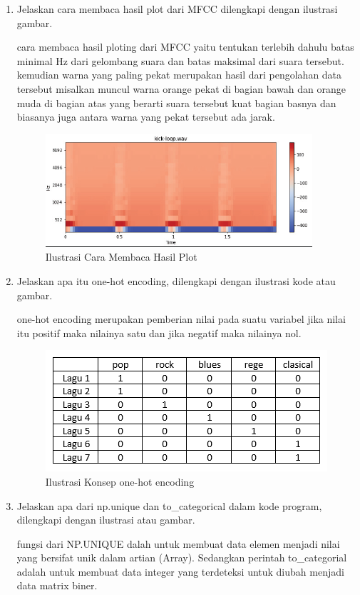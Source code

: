 \begin{enumerate}
\item Jelaskan cara membaca hasil plot dari MFCC dilengkapi dengan ilustrasi gambar. \par
cara membaca hasil ploting dari MFCC yaitu tentukan terlebih dahulu batas minimal Hz dari 
gelombang suara dan batas maksimal dari suara tersebut. kemudian warna yang paling pekat merupakan hasil 
dari pengolahan data tersebut misalkan muncul warna orange pekat di bagian bawah dan orange muda di bagian atas
yang berarti suara tersebut kuat bagian basnya dan biasanya juga antara warna yang pekat tersebut ada jarak.

\begin{figure}[ht]
\centering
\includegraphics[scale=0.5]{figures/1174003/chapter6/1,5.PNG}
\caption{Ilustrasi Cara Membaca Hasil Plot}
\label{contoh}
\end{figure}

\item Jelaskan apa itu one-hot encoding, dilengkapi dengan ilustrasi kode atau gambar.\par
one-hot encoding merupakan pemberian nilai pada suatu variabel jika nilai itu positif 
maka nilainya satu dan jika negatif maka nilainya nol.

\begin{figure}[ht]
\centering
\includegraphics[scale=0.5]{figures/1174003/chapter6/1,6.PNG}
\caption{Ilustrasi Konsep one-hot encoding}
\label{contoh}
\end{figure}

\item Jelaskan apa dari np.unique dan to\_categorical dalam kode program, dilengkapi dengan ilustrasi atau gambar.\par
fungsi dari NP.UNIQUE dalah untuk membuat data elemen menjadi nilai yang bersifat unik dalam artian (Array). 
Sedangkan perintah to\_categorial adalah untuk membuat data integer yang terdeteksi untuk diubah menjadi data matrix biner. 
    

\end{enumerate}
